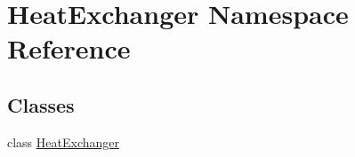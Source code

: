 \hypertarget{namespace_heat_exchanger}{}\section{Heat\+Exchanger Namespace Reference}
\label{namespace_heat_exchanger}
\subsection*{Classes}
\begin{DoxyCompactItemize}
\item 
class \hyperlink{class_heat_exchanger_1_1_heat_exchanger}{Heat\+Exchanger}
\end{DoxyCompactItemize}
